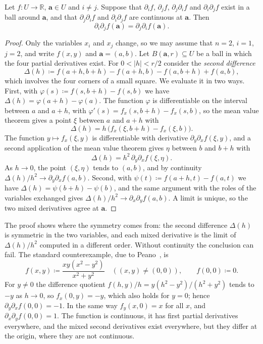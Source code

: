 \begin{theorem}
\label{thm:schwarz}
Let $f\colon U\to\mathbb R$, $\mathbf a\in U$ and $i\ne j$. Suppose that $\partial_if$, $\partial_jf$, $\partial_j\partial_if$ and $\partial_i\partial_jf$ exist in a ball around $\mathbf a$, and that $\partial_j\partial_if$ and $\partial_i\partial_jf$ are continuous at $\mathbf a$. Then
\[
\partial_i\partial_jf(\mathbf a)=\partial_j\partial_if(\mathbf a).
\]
\end{theorem}

\begin{proof}
Only the variables $x_i$ and $x_j$ change, so we may assume that $n=2$, $i=1$, $j=2$, and write $f(x,y)$ and $\mathbf a=(a,b)$. Let $B(\mathbf a,r)\subseteq U$ be a ball in which the four partial derivatives exist. For $0<|h|<r/2$ consider the \emph{second difference}
\[
\Delta(h)\coloneqq f(a+h,b+h)-f(a+h,b)-f(a,b+h)+f(a,b),
\]
which involves the four corners of a small square. We evaluate it in two ways. First, with $\varphi(s)\coloneqq f(s,b+h)-f(s,b)$ we have $\Delta(h)=\varphi(a+h)-\varphi(a)$. The function $\varphi$ is differentiable on the interval between $a$ and $a+h$, with $\varphi'(s)=f_x(s,b+h)-f_x(s,b)$, so the mean value theorem gives a point $\xi$ between $a$ and $a+h$ with
\[
\Delta(h)=h\,\bigl(f_x(\xi,b+h)-f_x(\xi,b)\bigr).
\]
The function $y\mapsto f_x(\xi,y)$ is differentiable with derivative $\partial_y\partial_xf(\xi,y)$, and a second application of the mean value theorem gives $\eta$ between $b$ and $b+h$ with
\[
\Delta(h)=h^2\,\partial_y\partial_xf(\xi,\eta).
\]
As $h\to0$, the point $(\xi,\eta)$ tends to $(a,b)$, and by continuity $\Delta(h)/h^2\to\partial_y\partial_xf(a,b)$. Second, with $\psi(t)\coloneqq f(a+h,t)-f(a,t)$ we have $\Delta(h)=\psi(b+h)-\psi(b)$, and the same argument with the roles of the variables exchanged gives $\Delta(h)/h^2\to\partial_x\partial_yf(a,b)$. A limit is unique, so the two mixed derivatives agree at $\mathbf a$.
\end{proof}

The proof shows where the symmetry comes from: the second difference $\Delta(h)$ is symmetric in the two variables, and each mixed derivative is the limit of $\Delta(h)/h^2$ computed in a different order. Without continuity the conclusion can fail. The standard counterexample, due to Peano~\cite{genocchi1884}, is
\[
f(x,y)\coloneqq\frac{xy(x^2-y^2)}{x^2+y^2}\quad((x,y)\ne(0,0)),\qquad f(0,0)\coloneqq0 .
\]
For $y\ne0$ the difference quotient $f(h,y)/h=y(h^2-y^2)/(h^2+y^2)$ tends to $-y$ as $h\to0$, so $f_x(0,y)=-y$, which also holds for $y=0$; hence $\partial_y\partial_xf(0,0)=-1$. In the same way $f_y(x,0)=x$ for all $x$, and $\partial_x\partial_yf(0,0)=1$. The function is continuous, it has first partial derivatives everywhere, and the mixed second derivatives exist everywhere, but they differ at the origin, where they are not continuous.


